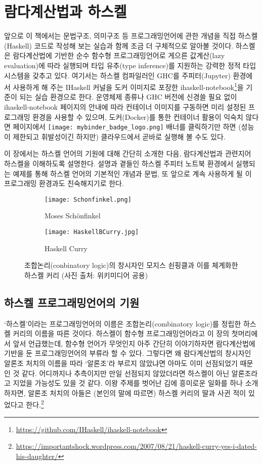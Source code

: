 \chapter{람다계산법과 하스켈}
앞으로 이 책에서는 문법구조, 의미구조 등 프로그래밍언어에 관한
개념을 직접 하스켈(Haskell) 코드로 작성해 보는 실습과 함께
조금 더 구체적으로 알아볼 것이다. 하스켈은 람다계산법에 기반한
순수 함수형 프로그래밍언어로 게으른 값계산(lazy evaluation)에
따라 실행되며 타입 유추(type inference)를 지원하는 강력한
정적 타입 시스템을 갖추고 있다. 여기서는 하스켈 컴파일러인
GHC를 주피터(Jupyter) 환경에서 사용하게 해 주는 IHaskell 커널을
도커 이미지로 포장한 ihaskell-notebook\footnote{%
\url{https://github.com/IHaskell/ihaskell-notebook}}을 기준이 되는
실습 환경으로 한다. 운영체제 종류나 GHC 버전에 신경쓸 필요 없이
ihaskell-notebook 페이지의 안내에 따라 컨테이너 이미지를 구동하면
미리 설정된 프로그래밍 환경을 사용할 수 있으며,
도커(Docker)를 통한 컨테이너 활용이 익숙치 않다면 페이지에서
\texttt{[image: mybinder\_badge\_logo.png]} 배너를 클릭하기만 하면
(성능이 제한되고 휘발성이긴 하지만) 클라우드에서 곧바로 실행해 볼 수도 있다.

이 장에서는 하스켈 언어의 기원에 대해 간단히 소개한 다음,
람다계산법과 관련지어 하스켈을 이해하도록 설명한다.
설명과 곁들인 하스켈 주피터 노트북 환경에서 실행되는 예제를 통해
하스켈 언어의 기본적인 개념과 문법, 또 앞으로 계속 사용하게 될
이 프로그래밍 환경과도 친숙해지기로 한다.
\newpage

\begin{figure}\centering
\begin{subfigure}[b]{.3\textwidth}\centering
\texttt{[image: Schonfinkel.png]}
\caption{Moses Sch\"onfinkel}
\end{subfigure}
\begin{subfigure}[b]{.3\textwidth}\centering
\texttt{[image: HaskellBCurry.jpg]}
\caption{Haskell Curry}
\end{subfigure}
\caption{조합논리(conbinatory logic)의 창시자인
         모지스 쇤핑클과 이를 체계화한 하스켈 커리
         {\footnotesize(사진 출처: 위키미디어 공용)} }
\end{figure}

\section{하스켈 프로그래밍언어의 기원}
`하스켈'이라는 프로그래밍언어의 이름은 조합논리(combinatory logic)를
정립한 하스켈 커리의 이름을 따른 것이다. 하스켈이 함수형 프로그래밍언어라고
이 장의 첫머리에서 앞서 언급했는데, 함수형 언어가 무엇인지 아주 간단히
이야기하자면 람다계산법에 기반을 둔 프로그래밍언어의 부류라 할 수 있다.
그렇다면 왜 람다계산법의 창시자인 알론조 처치의 이름을 따라 `알론조'라 부르지
않았냐면 아마도 이미 선점\cite{Ramsdell1989alonzo}되었기 때문인 것 같다.
어디까지나 추측이지만 만일 선점되지 않았더라면 하스켈이 아닌 알론조라고
지었을 가능성도 있을 것 같다. 이왕 주제를 벗어난 김에 흥미로운 일화를 하나
소개하자면, 알론조 처치의 아들은 (본인의 말에 따르면) 하스켈 커리의 딸과
사귄 적이 있었다고 한다.\footnote{%
\url{https://importantshock.wordpress.com/2007/08/21/haskell-curry-yes-i-dated-his-daughter/}}

